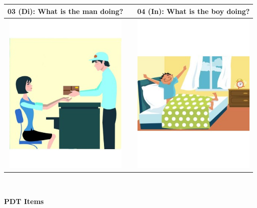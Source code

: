 \documentclass[12pt,notitlepage]{article}
\begin{document}
\begin{center}
\begin{tabular}{|c|c|c|}
\hline
03 (Di): What is the man doing? && 04 (In): What is the boy doing? \\
\hline
\includegraphics[width=16em,trim=0 0 0 -3]{figures/I03.jpg} & & \includegraphics[width=16em,trim=0 0 0 -3]{figures/I04.jpg} \\
\hline
\end{tabular}
\vspace{1em} \\

\clearpage

{\Large \textbf{PDT Items}}

\vspace{2em}


\end{center}
\end{document}
